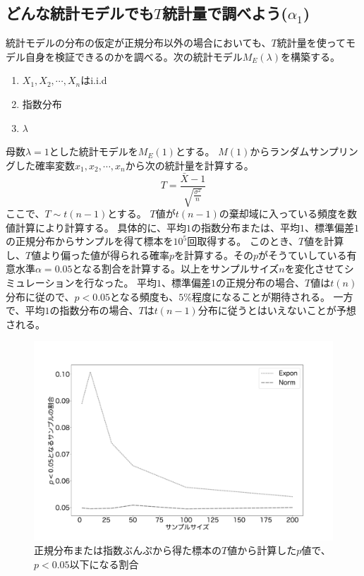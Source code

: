 \subsection{どんな統計モデルでも$T$統計量で調べよう($\alpha_1$)}
統計モデルの分布の仮定が正規分布以外の場合においても、$T$統計量を使ってモデル自身を検証できるのかを調べる。次の統計モデル$M_E(\lambda)$を構築する。
\begin{enumerate}
    \item $X_1,X_2,\cdots,X_n $はi.i.d
    \item 指数分布
    \item $\lambda$
\end{enumerate}
母数$\lambda=1$とした統計モデルを$M_E(1)$とする。
$M(1)$からランダムサンプリングした確率変数$x_1,x_2,\cdots,x_n$から次の統計量を計算する。
\begin{equation*}
    T = \frac{\bar{X}-1}{\sqrt{\frac{\sigma^2}{n}}}
\end{equation*}
ここで、$T \sim t(n-1)$とする。
$T$値が$t(n-1)$の棄却域に入っている頻度を数値計算により計算する。
具体的に、平均$1$の指数分布または、平均$1$、標準偏差$1$の正規分布からサンプルを得て標本を$10^5$回取得する。
このとき、$T$値を計算し、$T$値より偏った値が得られる確率$p$を計算する。その$p$がそうていしている有意水準$\alpha=0.05$となる割合を計算する。以上をサンプルサイズ$n$を変化させてシミュレーションを行なった。
平均$1$、標準偏差$1$の正規分布の場合、$T$値は$t(n)$分布に従ので、$p<0.05$となる頻度も、$5\%$程度になることが期待される。
一方で、平均$1$の指数分布の場合、$T$は$t(n-1)$分布に従うとはいえないことが予想される。%


\begin{figure}
    \begin{center}
        \includegraphics[width=15cm]{./image/04_/t_test_expon_norm.pdf}
        \caption{正規分布または指数ぶんぷから得た標本の$T$値から計算した$p$値で、$p<0.05$以下になる割合}
    \end{center}
\end{figure}

